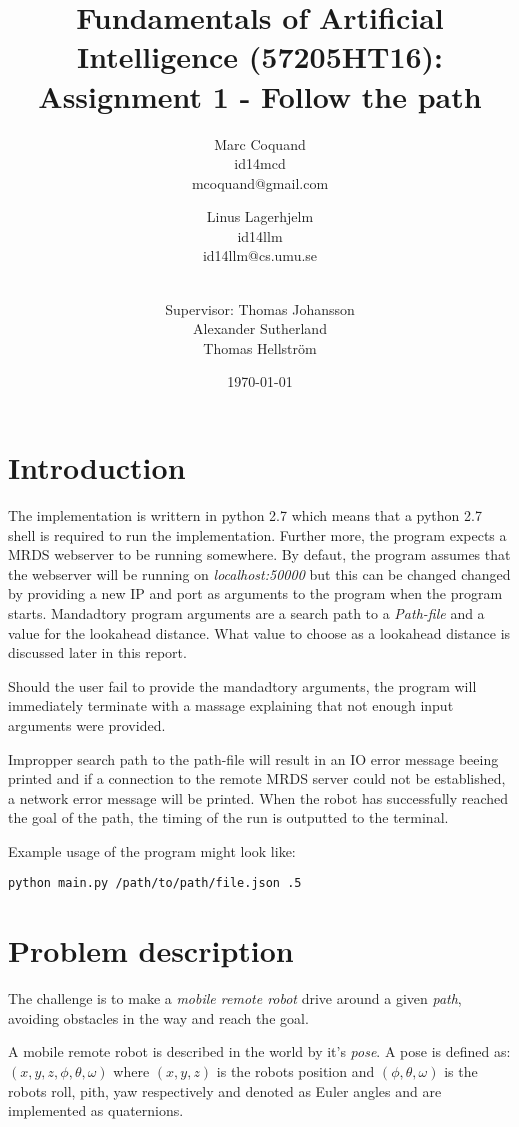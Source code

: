 \documentclass[12pt]{article}
\title{Fundamentals of Artificial Intelligence (57205HT16): Assignment 1 -
Follow the path}
\author{
    Marc Coquand \\ 
    id14mcd \\
    mcoquand@gmail.com \and
		Linus Lagerhjelm \\
		id14llm \\
		id14llm@cs.umu.se \and \\
		Supervisor: Thomas Johansson\\
		Alexander Sutherland \\
		Thomas Hellström
}
\date{\today}
\begin{document}
\maketitle

\newpage
\tableofcontents

\newpage
\section{Introduction}


The implementation is writtern in python 2.7 which means that a python 2.7 shell
is required to run the implementation. Further more, the program expects a MRDS
webserver to be running somewhere. By defaut, the program assumes that the
webserver will be running on \textit{localhost:50000} but this can be changed
changed by providing a new IP and port as arguments to the program when the
program starts. Mandadtory program arguments are a search path to a
\textit{Path-file} and a value for the lookahead distance. What value to choose
as a lookahead distance is discussed later in this report.

Should the user fail to provide the mandadtory arguments, the program will
immediately terminate with a massage explaining that not enough input
arguments were provided.

Impropper search path to the path-file will result in an IO error message
beeing printed and if a connection to the remote MRDS server could not
be established, a network error message will be printed. When the robot
has successfully reached the goal of the path, the timing of the run is
outputted to the terminal.

Example usage of the program might look like:
\begin{verbatim}
python main.py /path/to/path/file.json .5
\end{verbatim}

\section{Problem description}

The challenge is to make a \textit{mobile remote robot} drive around a given
\textit{path}, avoiding obstacles in the way and reach the goal. 

A mobile remote robot is described in the world by it's \textit{pose}. A pose is
defined as: $(x, y, z, \phi, \theta, \omega)$ where $(x,y,z)$ is the robots
position and $(\phi, \theta, \omega)$ is the robots roll, pith, yaw respectively
and denoted as Euler angles and are implemented as quaternions.
\end{document}
